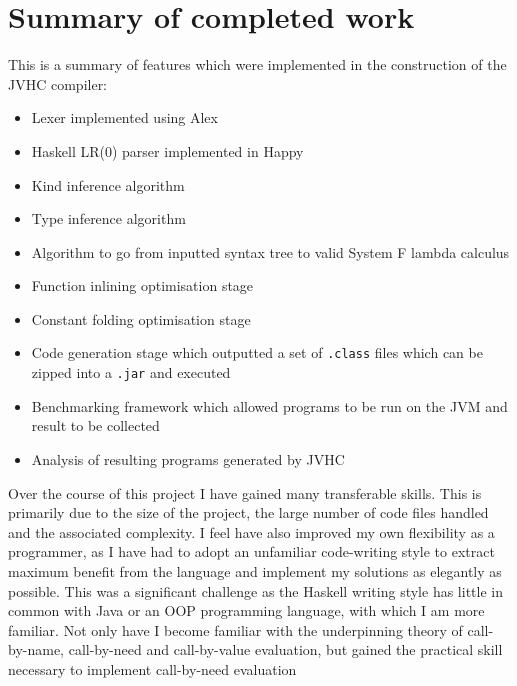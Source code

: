\documentclass[float=false, crop=false]{standalone}
\begin{document}
\section{Summary of completed work}

This is a summary of features which were implemented in the construction
of the JVHC compiler:

\begin{itemize}

  \item Lexer implemented using Alex

  \item Haskell LR(0) parser implemented in Happy

  \item Kind inference algorithm

  \item Type inference algorithm

  \item Algorithm to go from inputted syntax tree to valid
    System F lambda calculus

  \item Function inlining optimisation stage

  \item Constant folding optimisation stage

  \item Code generation stage which outputted a set of \verb|.class|
    files which can be zipped into a \verb|.jar| and executed

  \item Benchmarking framework which allowed programs to be run on the JVM and 
    result to be collected

  \item Analysis of resulting programs generated by JVHC
\end{itemize}
Over the course of this project I have gained many transferable
skills. This is primarily due to the size of the project, the large number of code files handled and the associated complexity. I feel have also improved my own flexibility as a programmer, as I have had to adopt an unfamiliar code-writing style to extract maximum benefit from the language and implement my solutions as elegantly as possible.
This was a significant challenge as the Haskell writing style has little in common with Java or an OOP
programming language, with which I am more familiar. Not only have I become familiar with the underpinning theory of call-by-name, call-by-need and 
call-by-value evaluation, but gained the practical skill necessary to implement call-by-need evaluation
\end{document}
